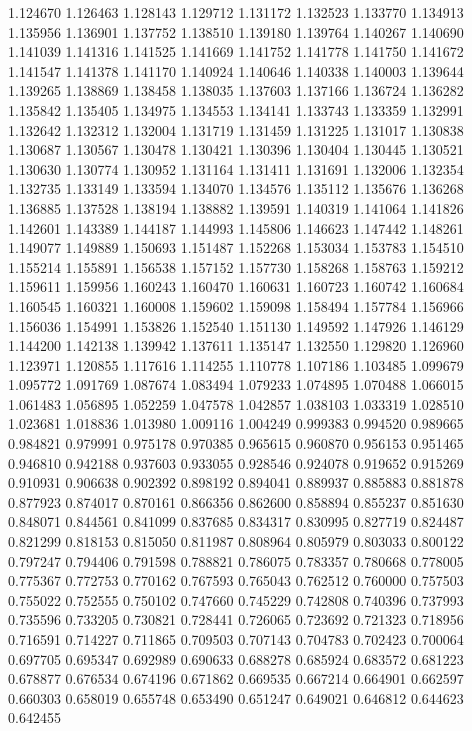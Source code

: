 1.124670
1.126463
1.128143
1.129712
1.131172
1.132523
1.133770
1.134913
1.135956
1.136901
1.137752
1.138510
1.139180
1.139764
1.140267
1.140690
1.141039
1.141316
1.141525
1.141669
1.141752
1.141778
1.141750
1.141672
1.141547
1.141378
1.141170
1.140924
1.140646
1.140338
1.140003
1.139644
1.139265
1.138869
1.138458
1.138035
1.137603
1.137166
1.136724
1.136282
1.135842
1.135405
1.134975
1.134553
1.134141
1.133743
1.133359
1.132991
1.132642
1.132312
1.132004
1.131719
1.131459
1.131225
1.131017
1.130838
1.130687
1.130567
1.130478
1.130421
1.130396
1.130404
1.130445
1.130521
1.130630
1.130774
1.130952
1.131164
1.131411
1.131691
1.132006
1.132354
1.132735
1.133149
1.133594
1.134070
1.134576
1.135112
1.135676
1.136268
1.136885
1.137528
1.138194
1.138882
1.139591
1.140319
1.141064
1.141826
1.142601
1.143389
1.144187
1.144993
1.145806
1.146623
1.147442
1.148261
1.149077
1.149889
1.150693
1.151487
1.152268
1.153034
1.153783
1.154510
1.155214
1.155891
1.156538
1.157152
1.157730
1.158268
1.158763
1.159212
1.159611
1.159956
1.160243
1.160470
1.160631
1.160723
1.160742
1.160684
1.160545
1.160321
1.160008
1.159602
1.159098
1.158494
1.157784
1.156966
1.156036
1.154991
1.153826
1.152540
1.151130
1.149592
1.147926
1.146129
1.144200
1.142138
1.139942
1.137611
1.135147
1.132550
1.129820
1.126960
1.123971
1.120855
1.117616
1.114255
1.110778
1.107186
1.103485
1.099679
1.095772
1.091769
1.087674
1.083494
1.079233
1.074895
1.070488
1.066015
1.061483
1.056895
1.052259
1.047578
1.042857
1.038103
1.033319
1.028510
1.023681
1.018836
1.013980
1.009116
1.004249
0.999383
0.994520
0.989665
0.984821
0.979991
0.975178
0.970385
0.965615
0.960870
0.956153
0.951465
0.946810
0.942188
0.937603
0.933055
0.928546
0.924078
0.919652
0.915269
0.910931
0.906638
0.902392
0.898192
0.894041
0.889937
0.885883
0.881878
0.877923
0.874017
0.870161
0.866356
0.862600
0.858894
0.855237
0.851630
0.848071
0.844561
0.841099
0.837685
0.834317
0.830995
0.827719
0.824487
0.821299
0.818153
0.815050
0.811987
0.808964
0.805979
0.803033
0.800122
0.797247
0.794406
0.791598
0.788821
0.786075
0.783357
0.780668
0.778005
0.775367
0.772753
0.770162
0.767593
0.765043
0.762512
0.760000
0.757503
0.755022
0.752555
0.750102
0.747660
0.745229
0.742808
0.740396
0.737993
0.735596
0.733205
0.730821
0.728441
0.726065
0.723692
0.721323
0.718956
0.716591
0.714227
0.711865
0.709503
0.707143
0.704783
0.702423
0.700064
0.697705
0.695347
0.692989
0.690633
0.688278
0.685924
0.683572
0.681223
0.678877
0.676534
0.674196
0.671862
0.669535
0.667214
0.664901
0.662597
0.660303
0.658019
0.655748
0.653490
0.651247
0.649021
0.646812
0.644623
0.642455
